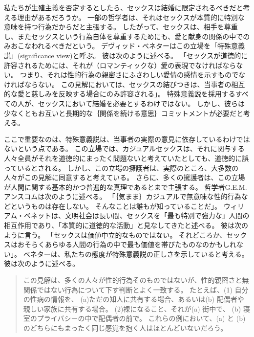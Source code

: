 \documentclass[paper=a4,book,openany]{jlreq}
\begin{document}
私たちが生殖主義を否定するとしたら、セックスは結婚に限定されるべきだと考える理由があるだろうか。
一部の哲学者は、それはセックスが本質的に特別な意味を持つ行為だからだと主張する。
したがって、セックスは、相手を尊重し、またセックスという行為自体を尊重するためにも、愛と献身の関係の中でのみおこなわれるべきだという。
デヴィッド・ベネターはこの立場を「特殊意義説」(significance view)と呼ぶ。
彼は次のように述べる。
「セックスが道徳的に許容されるためには、それが（ロマンティックな）愛の表現でなければならない。
つまり、それは性的行為の親密さにふさわしい愛情の感情を示すものでなければならない。
この見解においては、セックスの結びつきは、当事者の相互的な愛と慈しみを反映する場合にのみ許容される」\citep[p.182]{benatar02:_two_views_sexual_ethic}。
特殊意義説を採用するすべての人が、セックスにおいて結婚を必要とするわけではない。
しかし、彼らは少なくともお互いと長期的な｛関係を続ける意思｝{コミットメント}が必要だと考える。

ここで重要なのは、特殊意義説は、当事者の実際の意見に依存しているわけではないという点である。
この立場では、カジュアルセックスは、それに関与する人々全員がそれを道徳的にまったく問題ないと考えていたとしても、道徳的に誤っているとされる。
しかし、この立場の擁護者は、実際のところ、大多数の人々がこの見解に同意すると考えている。
さらに、多くの擁護者は、この立場が人間に関する基本的かつ普遍的な真理であるとまで主張する。
哲学者G.E.M. アンスコムは次のように述べる。
「｛気まま｝{カジュアル}で無意味な性的行為などというものは存在しない。
そんなことは誰もが知っていることだ」\citep{anscombe72contraception}。
ウィリアム・ベネットは、文明社会は長い間、セックスを「最も特別で強力な」人間の相互作用であり、「本質的に道徳的な活動」と見なしてきたと述べる。
彼は次のように言う。
「セックスは価値中立的なものではない。
それどころか、セックスはおそらくあらゆる人間の行為の中で最も価値を帯びたものなのかもしれない」\citep[p.19]{bennett98:_death_outrag}。
ベネターは、私たちの態度が特殊意義説の正しさを示していると考える。
彼は次のように述べる。

\begin{quote}
  この見解は、多くの人々が性的行為そのものではないが、性的親密さと無関係ではない行為について下す判断とよく一致する。
たとえば、(1) 自分の性病の情報を、 (a)ただの知人に共有する場合、あるいは(b) 配偶者や親しい家族に共有する場合。
(2)裸になること、それが(a) 街中で、 (b) 寝室のプライバシーの中で配偶者の前で。
これらの例において、(a) と (b) のどちらにもまったく同じ感覚を抱く人はほとんどいないだろう。
\citep[p.197]{benatar02:_two_views_sexual_ethic}
\end{quote}
\end{document}
